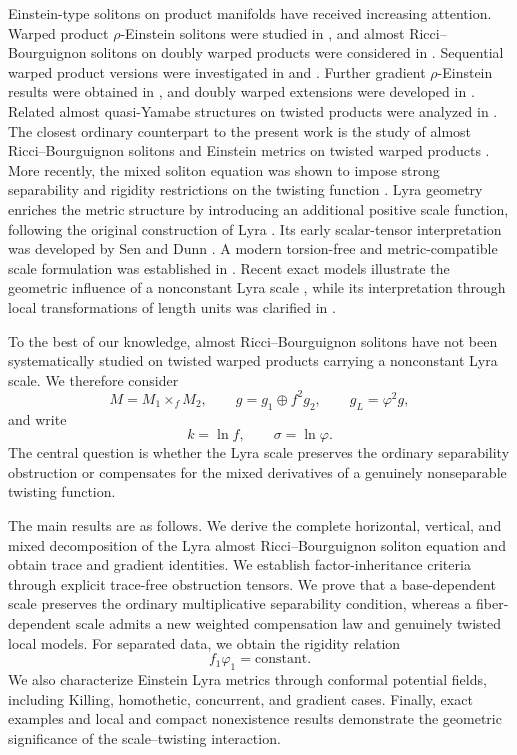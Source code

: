 \documentclass[a4paper,11pt]{article}
\theoremstyle{plain}
\numberwithin{equation}{section}
\begin{document}
Einstein-type solitons on product manifolds have received increasing
attention. Warped product \(\rho\)-Einstein solitons were studied in
\cite{BinTurkiEtAl2022}, and almost Ricci--Bourguignon solitons on
doubly warped products were considered in
\cite{ShenawyEtAl2023}. Sequential warped product versions were
investigated in \cite{PahanDutta2023} and
\cite{KayaOzgur2024}. Further gradient
\(\rho\)-Einstein results were obtained in
\cite{GulerUnal2025}, and doubly warped extensions were developed
in \cite{SemaryEtAl2026}. Related almost quasi-Yamabe structures on
twisted products were analyzed in
\cite{ElsharkawyEtAl2025Yamabe}. The closest ordinary counterpart
to the present work is the study of almost
Ricci--Bourguignon solitons and Einstein metrics on twisted warped
products \cite{ElsharkawyTawfiq2026}. More recently, the mixed
soliton equation was shown to impose strong separability and
rigidity restrictions on the twisting function
\cite{ElsharkawyCesaranoWanas2026}.
Lyra geometry enriches the metric structure by introducing an
additional positive scale function, following the original
construction of Lyra \cite{Lyra1951}. Its early scalar-tensor
interpretation was developed by Sen and Dunn
\cite{SenDunn1971}. A modern torsion-free and metric-compatible
scale formulation was established in
\cite{CuzinattoMoraisPimentel2021}. Recent exact models illustrate
the geometric influence of a nonconstant Lyra scale
\cite{BertinEtAl2025}, while its interpretation through local
transformations of length units was clarified in
\cite{ValadaoSobreroBergliaffa2026}.

To the best of our knowledge, almost Ricci--Bourguignon solitons
have not been systematically studied on twisted warped products
carrying a nonconstant Lyra scale. We therefore consider
\[
M=M_{1}\times_{f}M_{2},
\qquad
g=g_{1}\oplus f^{2}g_{2},
\qquad
g_{L}=\varphi^{2}g,
\]
and write
\[
k=\ln f,
\qquad
\sigma=\ln\varphi.
\]
The central question is whether the Lyra scale preserves the
ordinary separability obstruction or compensates for the mixed
derivatives of a genuinely nonseparable twisting function.

The main results are as follows. We derive the complete horizontal,
vertical, and mixed decomposition of the Lyra almost
Ricci--Bourguignon soliton equation and obtain trace and gradient
identities. We establish factor-inheritance criteria through
explicit trace-free obstruction tensors. We prove that a
base-dependent scale preserves the ordinary multiplicative
separability condition, whereas a fiber-dependent scale admits a
new weighted compensation law and genuinely twisted local models.
For separated data, we obtain the rigidity relation
\[
f_{1}\varphi_{1}=\mathrm{constant}.
\]
We also characterize Einstein Lyra metrics through conformal
potential fields, including Killing, homothetic, concurrent, and
gradient cases. Finally, exact examples and local and compact
nonexistence results demonstrate the geometric significance of the
scale--twisting interaction.
\end{document}
